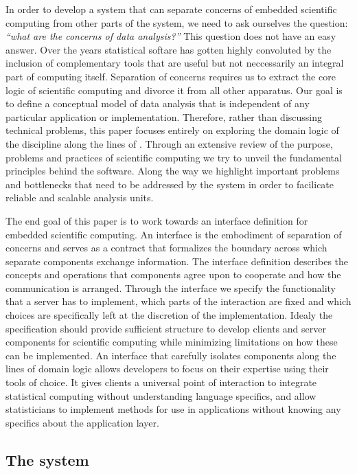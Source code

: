 In order to develop a system that can separate concerns of embedded scientific computing from other parts of the system, we need to ask ourselves the question: \emph{``what are the concerns of data analysis?''} This question does not have an easy answer. Over the years statistical softare has gotten highly convoluted by the inclusion of complementary tools that are useful but not neccessarily an integral part of computing itself. Separation of concerns requires us to extract the core logic of scientific computing and divorce it from all other apparatus. Our goal is to define a conceptual model of data analysis that is independent of any particular application or implementation. Therefore, rather than discussing technical problems, this paper focuses entirely on exploring the domain logic of the discipline along the lines of \cite{evans2004domain}. Through an extensive review of the purpose, problems and practices of scientific computing we try to unveil the fundamental principles behind the software. Along the way we highlight important problems and bottlenecks that need to be addressed by the system in order to facilicate reliable and scalable analysis units.

The end goal of this paper is to work towards an interface definition for embedded scientific computing. An interface is the embodiment of separation of concerns and serves as a contract that formalizes the boundary across which separate components exchange information. The interface definition describes the concepts and operations that components agree upon to cooperate and how the communication is arranged. Through the interface we specify the functionality that a server has to implement, which parts of the interaction are fixed and which choices are specifically left at the discretion of the implementation. Idealy the specification should provide sufficient structure to develop clients and server components for scientific computing while minimizing limitations on how these can be implemented. An interface that carefully isolates components along the lines of domain logic allows developers to focus on their expertise using their tools of choice. It gives clients a universal point of interaction to integrate statistical computing without understanding language specifics, and allow statisticians to implement methods for use in applications without knowing any specifics about the application layer.


\subsection{The \OpenCPU system}

